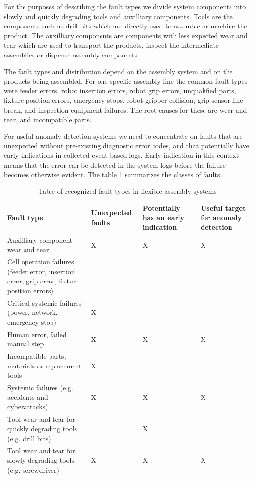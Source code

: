 \documentclass[journal]{IEEEtran}
\begin{document}
For the purposes of describing the fault types we divide system components into slowly and
quickly degrading tools and auxilliary components. Tools are the components such as drill bits which are directly used to assemble or
machine the product. The auxilliary components are components with less expected wear and tear which are used to transport the products,
inspect the intermediate assemblies or dispense assembly components.

The fault types and distribution depend on the assembly system
and on the products being assembled. For one
specific assembly line \cite{cong1997fault} the common fault types were feeder errors, robot insertion errors,
robot grip errors, unqualified parts, fixture position errors, emergency stops, robot gripper collision,
grip sensor line break, and inspection equipment failures. The root causes for these are wear and tear, and incompatible parts.

For useful anomaly detection systems we need to concentrate on faults that are unexpected without pre-existing diagnostic error codes, and that potentially have early indications
in collected event-based logs. Early indication in this context means that the error can be detected in the system logs before the failure becomes otherwise evident.
The table \ref{faults} summarizes the classes of faults.

\begin{table}[!t]
\renewcommand{\arraystretch}{1.3}
\caption{Table of recognized fault types in flexible assembly systems}
\label{faults}
\centering
\begin{tabular}{|p{25mm}|p{15mm}|p{15mm}|p{15mm}|}
\hline
Fault type & Unexpected faults & Potentially has an early indication & Useful target for anomaly detection \\
\hline
\hline
Auxilliary component wear and tear & X & X & X \\
\hline
Cell operation failures (feeder error, insertion error, grip error, fixture position errors) & & & \\
\hline
Critical systemic failures (power, network, emergency stop) & X & & \\
\hline
Human error, failed manual step & X & X & X \\
\hline
Incompatible parts, materials or replacement tools & X & & \\
\hline
Systemic failures (e.g. accidents and cyberattacks) & X & X & X \\
\hline
Tool wear and tear for quickly degrading tools (e.g. drill bits) & & X & \\
\hline
Tool wear and tear for slowly degrading tools (e.g. screwdriver) & X & X & X \\
\hline
\end{tabular}
\end{table}
\end{document}

